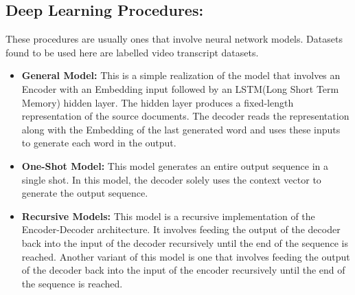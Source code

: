 \documentclass{ieeeaccess}
\begin{document}
    
\subsection{Deep Learning Procedures: }
These procedures are usually ones that involve neural network models. Datasets found to be used here are labelled video transcript datasets.\cite{DNN1}
\begin{itemize}
    \item \textbf{General Model: } This is a simple realization of the model that involves an Encoder with an Embedding input followed by an LSTM(Long Short Term Memory) hidden layer\cite{DNN4}. The hidden layer produces a fixed-length representation of the source documents. The decoder reads the representation along with the Embedding of the last generated word and uses these inputs to generate each word in the output.
    \item \textbf{One-Shot Model: } This model generates an entire output sequence in a single shot. In this model, the decoder solely uses the context vector to generate the output sequence.
    \item \textbf{Recursive Models: }This model\cite{DNN7} is a recursive implementation of the Encoder-Decoder architecture. It involves feeding the output of the decoder back into the input of the decoder recursively until the end of the sequence is reached. Another variant of this model is one that involves feeding the output of the decoder back into the input of the encoder recursively until the end of the sequence is reached.
\end{itemize}
    
\end{document}
